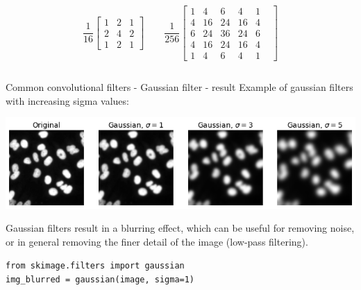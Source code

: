 \documentclass[9pt, aspectratio=169]{beamer}
\begin{document}
\begin{frame}
\begin{columns}
\begin{column}{.7\textwidth}
            $$\frac{1}{16}\begin{bmatrix}1&2&1\\2&4&2\\1&2&1\end{bmatrix} \qquad
                \frac{1}{256}\begin{bmatrix}1&4&6&4&1\\4&16&24&16&4\\6&24&36&24&6&\\4&16&24&16&4&\\1&4&6&4&1\end{bmatrix}$$
        \end{column}
    \end{columns}
\end{frame}

\begin{frame}
    {Common convolutional filters - Gaussian filter - result}
    Example of gaussian filters with increasing sigma values:

    \centering
    \includegraphics[width=\textwidth]{gaussian_filter_example.png}

    Gaussian filters result in a blurring effect, which can be useful for removing noise, or in general removing the finer detail of the image (low-pass filtering).

    \begin{codebox}
        \texttt{from skimage.filters import gaussian\\
            img\_blurred = gaussian(image, sigma=1)
        }
    \end{codebox}
\end{frame}
\end{document}
